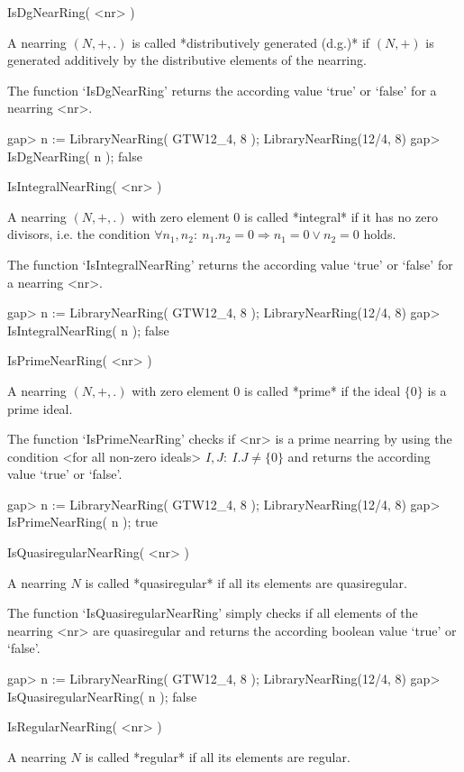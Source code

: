 \>IsDgNearRing( <nr> )

A nearring $(N,+,.)$ is called *distributively generated (d.g.)* if 
$(N,+)$ is generated additively by the distributive elements of the
nearring.

The function `IsDgNearRing' returns the according value `true' or `false'
for a nearring <nr>.

\beginexample
    gap> n := LibraryNearRing( GTW12_4, 8 );            
    LibraryNearRing(12/4, 8)
    gap> IsDgNearRing( n );
    false
\endexample

\>IsIntegralNearRing( <nr> )

A nearring $(N,+,.)$ with zero element $0$ is called *integral* if 
it has no zero divisors, i.e. the condition $\forall n_1,n_2:\ 
n_1 . n_2 = 0 \Rightarrow n_1 = 0 \lor n_2 = 0$ holds.

The function `IsIntegralNearRing' returns 
the according value `true' or `false' for a nearring <nr>.

\beginexample
    gap> n := LibraryNearRing( GTW12_4, 8 );            
    LibraryNearRing(12/4, 8)
    gap> IsIntegralNearRing( n );
    false
\endexample

\>IsPrimeNearRing( <nr> )

A nearring $(N,+,.)$ with zero element $0$ is called *prime* if 
the ideal $\{ 0 \}$ is a prime ideal.

The function `IsPrimeNearRing' checks if <nr> is a prime nearring
by using the condition <for all non-zero ideals> $I,J:\ I . J \ne 
\{ 0 \}$ and returns the according value `true' or `false'.

\beginexample
    gap> n := LibraryNearRing( GTW12_4, 8 );            
    LibraryNearRing(12/4, 8)
    gap> IsPrimeNearRing( n );
    true
\endexample

\>IsQuasiregularNearRing( <nr> )

A nearring $N$ is called *quasiregular* if all its elements are
quasiregular.

The function `IsQuasiregularNearRing' simply checks if all elements
of the nearring <nr> are quasiregular and returns the according 
boolean value `true' or `false'.

\beginexample
    gap> n := LibraryNearRing( GTW12_4, 8 );            
    LibraryNearRing(12/4, 8)
    gap> IsQuasiregularNearRing( n );
    false
\endexample

\>IsRegularNearRing( <nr> )

A nearring $N$ is called *regular* if all its elements are regular.

